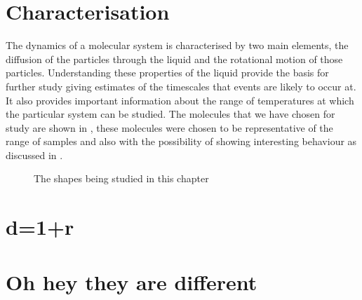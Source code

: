 \section{Characterisation}

The dynamics of a molecular system is characterised by two main elements, the diffusion of the particles through the liquid and the rotational motion of those particles. Understanding these properties of the liquid provide the basis for further study giving estimates of the timescales that events are likely to occur at. It also provides important information about the range of temperatures at which the particular system can be studied. The molecules that we have chosen for study are shown in , these molecules were chosen to be representative of the range of samples and also with the possibility of showing interesting behaviour as discussed in .

\begin{figure}
    \caption{The shapes being studied in this chapter}
\end{figure}



 \section{d=1+r}

\section{Oh hey they are different}
